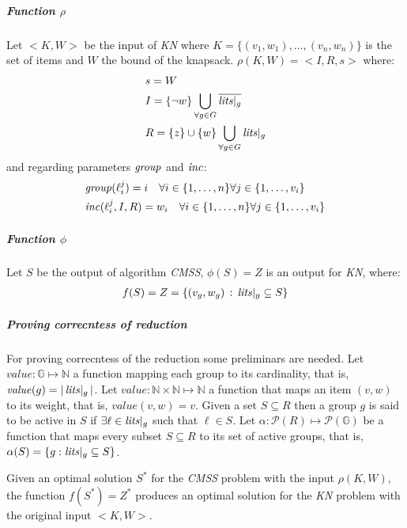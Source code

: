 \subparagraph{Function $\rho$} 
Let $<K,W>$ be the input of \textit{KN} where $K=\{(v_1,w_1),\hdots,(v_n,w_n)\}$ is the set of items and 
$W$ the bound of the knapsack.
$\rho(K,W) = <I,R,s>$
where: 
\begin{align*}
    &s = W \\
    &I = \{\neg w\} \bigcup_{\forall g \in G} \overline{\mathit{lits}|_g} \\
    &R = \{z\} \cup \{w\} \bigcup_{\forall g \in G} \mathit{lits}|_g\\
\end{align*}
and regarding parameters $\mathit{group}$ and $\mathit{inc}$:
\begin{align*}
    & \mathit{group}(\ell_i^j) = i \quad \forall i \in \{1, \hdots, n\} \forall j \in \{ 1, \hdots, v_i \} \\
    & \mathit{inc}(\ell_i^j, I, R) = w_i \quad \forall i \in \{1, \hdots, n\} \forall j \in \{ 1, \hdots, v_i \} \\    
\end{align*}

\subparagraph{Function $\phi$} 
Let $S$ be the output of algorithm \textit{CMSS}, $\phi(S) = Z$ is an output for \textit{KN},
where:
\begin{align*}
    f(S) =  Z  = \{(v_g, w_g) \,:\, \mathit{lits}|_g \subseteq S\}\\
\end{align*}

\subparagraph{Proving correcntess of reduction}
For proving correcntess of the reduction some preliminars are needed.
Let $\mathit{value}: \mathbb{G} \mapsto \mathbb{N}$ a function 
mapping each group to its cardinality, that is, $\mathit{value}(g) = |\,\mathit{lits}|_g\,|$.
Let $\mathit{value}: \mathbb{N} \times \mathbb{N} \mapsto \mathbb{N}$ a function that maps 
an item $(v,w)$ to its weight, that is, $\mathit{value}(v,w) = v$.
Given a set $S \subseteq R$ then a group $g$ is said to be active in $S$
if $\exists \ell \in \mathit{lits}|_g$ such that $\ell \in S$.
Let $\alpha: \mathcal{P}(R) \mapsto \mathcal{P}(\mathbb{G})$ be a function that 
maps every subset $S \subseteq R$ to its set of active groups, that is, 
$\alpha(S) = \{g : \mathit{lits}|_g \subseteq S\}$.

\begin{theorem}
    Given an optimal solution \( S^* \) for the \textit{CMSS} problem with the input $\rho(K,W)$, 
    the function \( f(S^*) = Z^* \) produces an optimal solution for the \textit{KN}
    problem with the original input \( <K,W> \).
\end{theorem}

